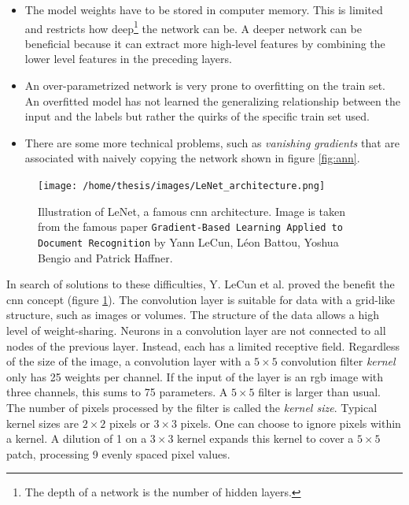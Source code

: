 \begin{itemize}
    \item The model weights have to be stored in computer memory. 
    This is limited and restricts how deep\footnote{The depth of a network is the number of hidden layers.} the network can be.
    A deeper network can be beneficial because it can extract more high-level \Gls{features} by combining the lower level features in the preceding layers. 
    \item An over-parametrized network is very prone to overfitting on the train set. 
    An overfitted model has not learned the generalizing relationship between the input and the labels but rather the quirks of the specific train set used.
    \item There are some more technical problems, such as \textit{vanishing gradients} that are associated with naively copying the network shown in figure \ref{fig:ann}. 
\end{itemize}
\begin{figure}
    \centering
    \texttt{[image: /home/thesis/images/LeNet\_architecture.png]}
    \caption{
        Illustration of LeNet, a famous \Gls{cnn} architecture.
        Image is taken from the famous paper \texttt{Gradient-Based Learning Applied to Document Recognition} by Yann LeCun, Léon Battou, Yoshua Bengio and Patrick Haffner. \label{fig:LeNet}
        }
\end{figure}
\par{
    In search of solutions to these difficulties, Y. LeCun et al. proved the benefit the \Gls{cnn} concept (figure \ref{fig:LeNet}).
    The convolution layer is suitable for data with a grid-like structure, such as images or volumes.
    The structure of the data allows a high level of weight-sharing. 
    Neurons in a convolution layer are not connected to all nodes of the previous layer. Instead, each has a limited receptive field.
    Regardless of the size of the image, a convolution layer with a $5\times 5$ convolution filter \textit{kernel} only has 25 weights per channel.
    If the input of the layer is an \acrshort{rgb} image with three channels, this sums to 75 parameters. A $5\times 5$ filter is larger than usual.
    The number of pixels processed by the filter is called the \textit{kernel size}. 
    Typical kernel sizes are $2\times 2$ pixels or $3\times 3$ pixels.
    One can choose to ignore pixels within a kernel. A dilution of 1 on a $3\times 3$ kernel expands this kernel to cover a $5\times 5$ patch, processing 9 evenly spaced pixel values. 
}
